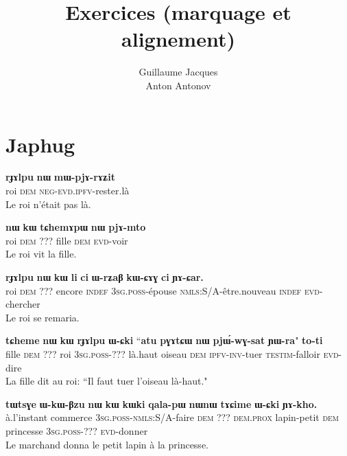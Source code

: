 \documentclass[oldfontcommands,twoside,a4paper,12pt]{article}
\newcommand{\ipa}[1]{{\phon\textbf{#1}}}
\begin{document}
\title{Exercices (marquage et alignement)}
\author{Guillaume Jacques\\Anton Antonov}
\maketitle

\section{Japhug}
 \begin{exe}
\ex
\gll
\ipa{rɟɤlpu}  	\ipa{nɯ}  	\ipa{mɯ-pjɤ-rɤʑit}  \\
roi \textsc{dem} \textsc{neg-evd.ipfv}-rester.là \\
 \glt Le roi n'était pas là.
\end{exe}

 \begin{exe}
\ex 
\gll \ipa{rɟɤlpu}  	\ipa{nɯ}  	\ipa{kɯ}  	\ipa{tɕhemɤpɯ}  	\ipa{nɯ}  	\ipa{pjɤ-mto}   \\
roi \textsc{dem} ??? fille \textsc{dem} \textsc{evd}-voir \\
\glt Le roi vit la fille.
\end{exe}

 \begin{exe}
\ex 
\gll 
\ipa{rɟɤlpu}  	\ipa{nɯ}  	\ipa{kɯ}  	\ipa{li}  	\ipa{ci}  	\ipa{ɯ-rʑaβ}  	\ipa{kɯ-ɕɤɣ}  	\ipa{ci}  	\ipa{ɲɤ-ɕar.}  	 \\
roi \textsc{dem} ??? encore \textsc{indef} \textsc{3sg.poss}-épouse \textsc{nmls}:S/A-être.nouveau \textsc{indef}  \textsc{evd}-chercher \\
\glt Le roi se remaria.
\end{exe}

 \begin{exe}
\ex 
\gll 
\ipa{tɕheme}  	\ipa{nɯ}  	\ipa{kɯ}  	\ipa{rɟɤlpu}  	\ipa{ɯ-ɕki}  	``\ipa{atu}  	\ipa{pɣɤtɕɯ}  	\ipa{nɯ}  	\ipa{pjɯ́-wɣ-sat}  	\ipa{ɲɯ-ra}"  	\ipa{to-ti}  	\\
fille \textsc{dem} ??? roi \textsc{3sg.poss}-??? là.haut oiseau \textsc{dem} \textsc{ipfv-inv}-tuer \textsc{testim}-falloir \textsc{evd}-dire \\
\glt La fille dit au roi: ``Il faut tuer l'oiseau là-haut."
\end{exe}


 \begin{exe}
\ex 
\gll \ipa{iɕqha}  	\ipa{tɯtsɣe}  	\ipa{ɯ-kɯ-βzu}  	\ipa{nɯ}  	\ipa{kɯ}  	\ipa{kɯki}  	\ipa{qala-pɯ}  	\ipa{nɯnɯ}  	\ipa{tɤɕime}  	\ipa{ɯ-ɕki}  	\ipa{ɲɤ-kho.}  	\\
à.l'instant commerce \textsc{3sg.poss-nmls}:S/A-faire \textsc{dem} ??? \textsc{dem.prox} lapin-petit \textsc{dem} princesse \textsc{3sg.poss}-??? \textsc{evd}-donner \\
\glt Le marchand donna le petit lapin à la princesse.
\end{exe}
\end{document}
